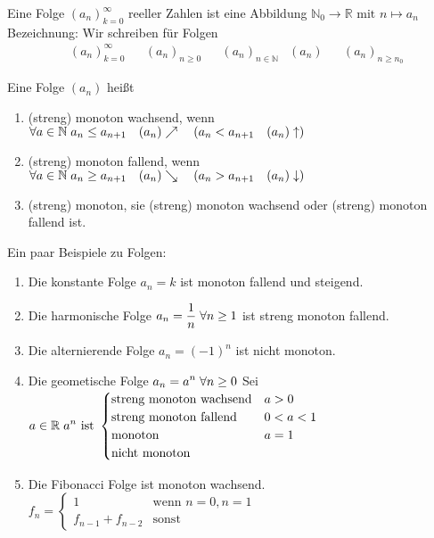 \documentclass[a4paper,titlepage,oneside]{article}
\def\N{\ensuremath{\mathbb{N}} }
\def\R{\ensuremath{\mathbb{R}} }
\def\fa{\ensuremath{\forall}}
\def\sp{\hspace{0,1cm}}
\theoremstyle{thmstyle}
\begin{document}
\begin{subdefi}
Eine Folge $(a_n)_{k=0}^{\infty}$ reeller Zahlen ist eine Abbildung $\N_0 \rightarrow \R\text{ mit } n \mapsto a_n$
Bezeichnung: Wir schreiben für Folgen
\begin{align*}
&(a_n)_{k=0}^{\infty} && (a_n)_{n\ge0} && (a_n)_{n\in\N} & (a_n) && (a_n)_{n\ge n_0}
\end{align*}
\end{subdefi}

\newpage
\begin{subdefi}
Eine Folge \((a_n)\) heißt
\begin{enumerate}
\item (streng) monoton wachsend, wenn \( \fa a \in \N \sp a_n \le a_{n+1}	\quad (a_n)\nearrow	\quad (a_n < a_{n+1} \quad (a_n)\uparrow)\)
\item (streng) monoton fallend, wenn \( \fa a \in \N \sp a_n \ge a_{n+1}	\quad (a_n)\searrow	\quad (a_n > a_{n+1} \quad (a_n)\downarrow)\)
\item (streng) monoton, sie (streng) monoton wachsend oder (streng) monoton fallend ist.
\end{enumerate}
\end{subdefi}

\begin{subbsp}
Ein paar Beispiele zu Folgen:
\begin{enumerate}[label=(\arabic*)]
\item Die konstante Folge \(a_n = k\) ist monoton fallend und steigend.
\item Die harmonische Folge $ \displaystyle a_n = \frac{1}{n} \sp \fa n \ge 1$ ist streng monoton fallend.
\item Die alternierende Folge $ \displaystyle a_n = (-1)^n $ ist nicht monoton.
\item Die geometische Folge $ \displaystyle  a_n = a^n \sp \fa n \ge 0 $ Sei $ \displaystyle a \in \R \sp a^n \text{ ist }
				\begin{cases}			\text{streng monoton wachsend} 	& a > 0\\
									\text{streng monoton fallend} 		& 0 < a < 1\\
									\text{monoton} 					& a = 1\\
									\text{nicht monoton} 				&  \end{cases} $
\item Die Fibonacci Folge ist monoton wachsend. $ \displaystyle f_n = \begin{cases}	1				& \text{wenn } n = 0, n = 1\\
																f_{n-1} + f_{n-2}	& \text{sonst} \end{cases} $
\end{enumerate}
\end{subbsp}
\end{document}
